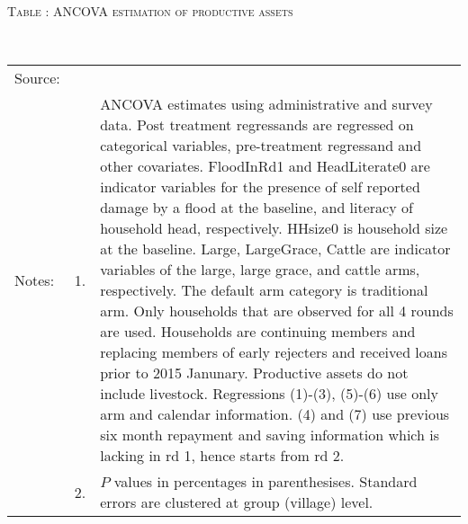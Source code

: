 


\hspace{-1cm}\begin{minipage}[t]{14cm}
\hfil\textsc{\normalsize Table \thetable: ANCOVA estimation of productive assets\label{tab ANCOVA productive assets}}\\
\setlength{\tabcolsep}{1pt}
\setlength{\baselineskip}{8pt}
\renewcommand{\arraystretch}{.55}
\hfil{}\\
\renewcommand{\arraystretch}{.8}
\setlength{\tabcolsep}{1pt}
\begin{tabular}{>{\hfill\scriptsize}p{1cm}<{}>{\hfill\scriptsize}p{.25cm}<{}>{\scriptsize}p{12cm}<{\hfill}}
Source:& \multicolumn{2}{l}{\scriptsize Estimated with GUK administrative and survey data.}\\
Notes: & 1. & ANCOVA estimates using administrative and survey data. Post treatment regressands are regressed on categorical variables, pre-treatment regressand and other covariates. \textsf{FloodInRd1} and \textsf{HeadLiterate0} are indicator variables for the presence of self reported damage by a flood at the baseline, and literacy of household head, respectively. \textsf{HHsize0} is household size at the baseline. \textsf{Large}, \textsf{LargeGrace}, \textsf{Cattle} are indicator variables of the \textsf{large}, \textsf{large grace}, and \textsf{cattle} arms, respectively. The default arm category is \textsf{traditional} arm. Only households that are observed for all 4 rounds are used. Households are continuing members and replacing members of early rejecters and received loans prior to 2015 Janunary. Productive assets do not include livestock. Regressions (1)-(3), (5)-(6) use only arm and calendar information. (4) and (7) use previous six month repayment and saving information which is lacking in rd 1, hence starts from rd 2.\\
& 2. & $P$ values in percentages in parenthesises. Standard errors are clustered at group (village) level.
\end{tabular}
\end{minipage}

